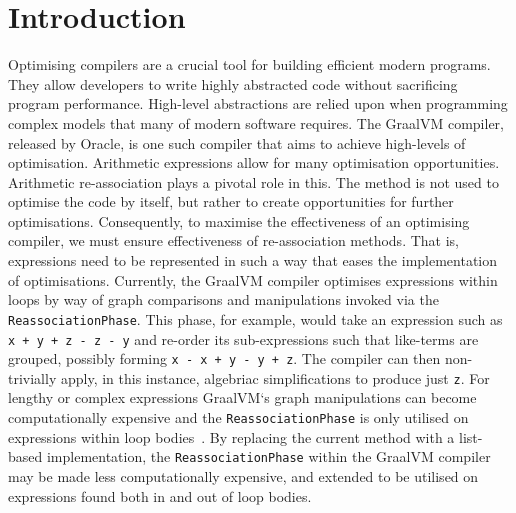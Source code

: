 \documentclass[12pt,openany,a4paper]{book}
\begin{document}
\cleardoublepage

\mainmatter


%
%
%
%	
%	

\chapter{Introduction}
\label{intro}

Optimising compilers are a crucial tool for building efficient 
modern programs. They allow developers to write highly abstracted code without 
sacrificing program performance. High-level abstractions are relied upon when
programming complex models that many of modern software requires. The GraalVM
compiler, released by Oracle, is one such compiler that aims to achieve 
high-levels of optimisation. Arithmetic expressions allow for many optimisation opportunities.
Arithmetic re-association plays a pivotal role in this. The method is not used
to optimise the code by itself, but rather to create opportunities for further
optimisations. Consequently, to maximise the effectiveness of an optimising
compiler, we must ensure effectiveness of re-association methods. That is,
expressions need to be represented in such a way that eases the implementation
of optimisations.
Currently, the GraalVM compiler optimises expressions within loops by way 
of graph comparisons and manipulations invoked via the \verb|ReassociationPhase|.
This phase, for example, would take an expression such as \verb|x + y + z - z - y| and
re-order its sub-expressions such that like-terms are grouped, possibly forming
\verb|x - x + y - y + z|. The compiler can then non-trivially apply, in this
instance, algebriac simplifications to produce just \verb|z|.
For lengthy or complex expressions GraalVM`s graph manipulations can become computationally 
expensive and the \verb|ReassociationPhase| is only utilised on expressions within
loop bodies~\cite{graalsrc}. By replacing the current method with a list-based
implementation, the \verb|ReassociationPhase| within the GraalVM compiler may be
made less computationally expensive, and extended to be utilised on expressions
found both in and out of loop bodies.\\
\end{document}
